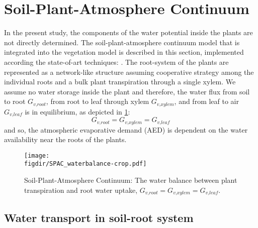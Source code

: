 \section{Soil-Plant-Atmosphere Continuum}
\label{sec:spac}

In the present study, the components of the water potential inside the plants are not directly determined. The soil-plant-atmosphere continuum model that is integrated into the vegetation model is described in this section, implemented according the state-of-art techniques: \citep{Volpe2013,Manoli2014,Launiainen2015,Idso1977,Manzoni2011,Farquhar1980}. The root-system of the plants are represented as a network-like structure assuming cooperative strategy among the individual roots and a bulk plant transpiration through a single xylem. We assume no water storage inside the plant and therefore, the water flux from soil to root $G_{\textit{v,root}}$, from root to leaf through xylem $G_{\textit{v,xylem}}$, and from leaf to air $G_{\textit{v,leaf}}$ is in equilibrium, as depicted in \cref{fig:SPAC_waterbalance}:
\begin{equation}
G_{\textit{v,root}} = G_{\textit{v,xylem}} = G_{\textit{v,leaf}}
\label{eq:massfluxeq}
\end{equation}
and so, the atmospheric evaporative demand (AED) is dependent on the water availability near the roots of the plants.

\begin{figure}[t]
	\centering
	\texttt{[image: \\figdir/SPAC\_waterbalance-crop.pdf]}
	\caption{Soil-Plant-Atmosphere Continuum: The water balance between plant transpiration and root water uptake, $G_{\textit{v,root}} = G_{\textit{v,xylem}} = G_{\textit{v,leaf}}$.}
	\label{fig:SPAC_waterbalance}
\end{figure}

\subsection{Water transport in soil-root system}

